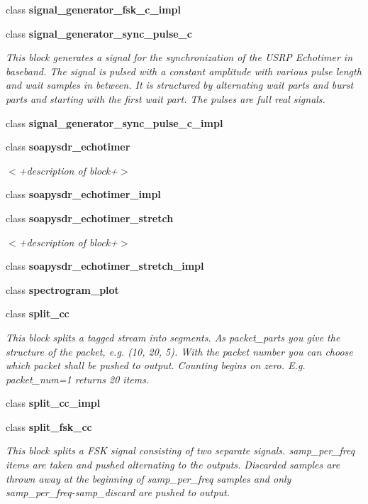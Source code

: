 \begin{DoxyCompactItemize}
class {\bf signal\+\_\+generator\+\_\+fsk\+\_\+c\+\_\+impl}
\item 
class {\bf signal\+\_\+generator\+\_\+sync\+\_\+pulse\+\_\+c}
\begin{DoxyCompactList}\small\item\em This block generates a signal for the synchronization of the U\+S\+RP Echotimer in baseband. The signal is pulsed with a constant amplitude with various pulse length and wait samples in between. It is structured by alternating wait parts and burst parts and starting with the first wait part. The pulses are full real signals. \end{DoxyCompactList}\item 
class {\bf signal\+\_\+generator\+\_\+sync\+\_\+pulse\+\_\+c\+\_\+impl}
\item 
class {\bf soapysdr\+\_\+echotimer}
\begin{DoxyCompactList}\small\item\em $<$+description of block+$>$ \end{DoxyCompactList}\item 
class {\bf soapysdr\+\_\+echotimer\+\_\+impl}
\item 
class {\bf soapysdr\+\_\+echotimer\+\_\+stretch}
\begin{DoxyCompactList}\small\item\em $<$+description of block+$>$ \end{DoxyCompactList}\item 
class {\bf soapysdr\+\_\+echotimer\+\_\+stretch\+\_\+impl}
\item 
class {\bf spectrogram\+\_\+plot}
\item 
class {\bf split\+\_\+cc}
\begin{DoxyCompactList}\small\item\em This block splits a tagged stream into segments. As packet\+\_\+parts you give the structure of the packet, e.\+g. (10, 20, 5). With the packet number you can choose which packet shall be pushed to output. Counting begins on zero. E.\+g. packet\+\_\+num=1 returns 20 items. \end{DoxyCompactList}\item 
class {\bf split\+\_\+cc\+\_\+impl}
\item 
class {\bf split\+\_\+fsk\+\_\+cc}
\begin{DoxyCompactList}\small\item\em This block splits a F\+SK signal consisting of two separate signals. samp\+\_\+per\+\_\+freq items are taken and pushed alternating to the outputs. Discarded samples are thrown away at the beginning of samp\+\_\+per\+\_\+freq samples and only samp\+\_\+per\+\_\+freq-\/samp\+\_\+discard are pushed to output. \end{DoxyCompactList}\item 

\end{DoxyCompactItemize}
